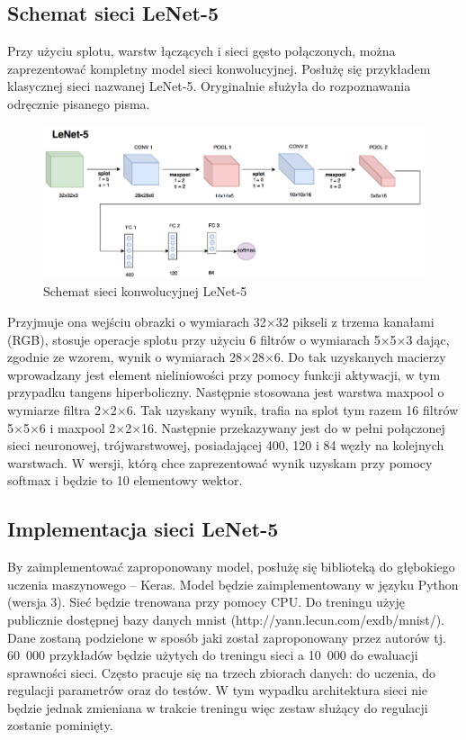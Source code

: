 \subsection{Schemat sieci LeNet-5}

Przy użyciu splotu, warstw łączących i sieci gęsto połączonych, można zaprezentować kompletny model sieci konwolucyjnej. Posłużę się przykładem klasycznej sieci nazwanej LeNet-5. Oryginalnie służyła do rozpoznawania odręcznie pisanego pisma.

\begin{figure}[ht]
\centerline{\includegraphics[scale=1]{resources/lenet5.png}}
\caption{Schemat sieci konwolucyjnej LeNet-5}
\label{fig:lenet5}
\end{figure}

Przyjmuje ona wejściu obrazki o wymiarach 32\(\times\)32 pikseli z trzema kanałami (RGB), stosuje operacje splotu przy użyciu 6 filtrów o wymiarach 5\(\times\)5\(\times\)3 dając, zgodnie ze wzorem, wynik o wymiarach 28\(\times\)28\(\times\)6. Do tak uzyskanych macierzy wprowadzany jest element nieliniowości przy pomocy funkcji aktywacji, w tym przypadku tangens hiperboliczny. Następnie stosowana jest warstwa maxpool o wymiarze filtra 2\(\times\)2\(\times\)6. Tak uzyskany wynik, trafia na splot
tym razem 16 filtrów 5\(\times\)5\(\times\)6 i maxpool 2\(\times\)2\(\times\)16. Następnie przekazywany jest do w pełni połączonej sieci neuronowej, trójwarstwowej, posiadającej 400, 120 i 84 węzły na kolejnych warstwach. W wersji, którą chce zaprezentować wynik uzyskam przy pomocy softmax i będzie to 10 elementowy wektor.

\subsection{Implementacja sieci LeNet-5}

By zaimplementować zaproponowany model, posłużę się biblioteką do
głębokiego uczenia maszynowego -- Keras. Model będzie zaimplementowany w
języku Python (wersja 3). Sieć będzie trenowana przy pomocy CPU. Do
treningu użyję publicznie dostępnej bazy danych mnist
(http://yann.lecun.com/exdb/mnist/). Dane zostaną podzielone w
sposób jaki został zaproponowany przez autorów tj. 60~000 przykładów
będzie użytych do treningu sieci a 10~000 do ewaluacji sprawności sieci.
Często pracuje się na trzech zbiorach danych: do uczenia, do regulacji
parametrów oraz do testów. W tym wypadku architektura sieci nie będzie
jednak zmieniana w trakcie treningu więc zestaw służący do regulacji
zostanie pominięty.

